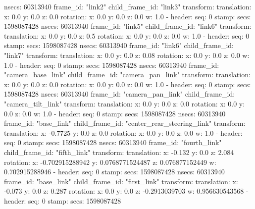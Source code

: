         nsecs:  60313940
      frame_id: "link2"
    child_frame_id: "link3"
    transform: 
      translation: 
        x: 0.0
        y: 0.0
        z: 0.0
      rotation: 
        x: 0.0
        y: 0.0
        z: 0.0
        w: 1.0
  - 
    header: 
      seq: 0
      stamp: 
        secs: 1598087428
        nsecs:  60313940
      frame_id: "link5"
    child_frame_id: "link6"
    transform: 
      translation: 
        x: 0.0
        y: 0.0
        z: 0.5
      rotation: 
        x: 0.0
        y: 0.0
        z: 0.0
        w: 1.0
  - 
    header: 
      seq: 0
      stamp: 
        secs: 1598087428
        nsecs:  60313940
      frame_id: "link6"
    child_frame_id: "link7"
    transform: 
      translation: 
        x: 0.0
        y: 0.0
        z: 0.08
      rotation: 
        x: 0.0
        y: 0.0
        z: 0.0
        w: 1.0
  - 
    header: 
      seq: 0
      stamp: 
        secs: 1598087428
        nsecs:  60313940
      frame_id: "camera_base_link"
    child_frame_id: "camera_pan_link"
    transform: 
      translation: 
        x: 0.0
        y: 0.0
        z: 0.0
      rotation: 
        x: 0.0
        y: 0.0
        z: 0.0
        w: 1.0
  - 
    header: 
      seq: 0
      stamp: 
        secs: 1598087428
        nsecs:  60313940
      frame_id: "camera_pan_link"
    child_frame_id: "camera_tilt_link"
    transform: 
      translation: 
        x: 0.0
        y: 0.0
        z: 0.0
      rotation: 
        x: 0.0
        y: 0.0
        z: 0.0
        w: 1.0
  - 
    header: 
      seq: 0
      stamp: 
        secs: 1598087428
        nsecs:  60313940
      frame_id: "base_link"
    child_frame_id: "center_rear_steering_link"
    transform: 
      translation: 
        x: -0.7725
        y: 0.0
        z: 0.0
      rotation: 
        x: 0.0
        y: 0.0
        z: 0.0
        w: 1.0
  - 
    header: 
      seq: 0
      stamp: 
        secs: 1598087428
        nsecs:  60313940
      frame_id: "fourth_link"
    child_frame_id: "fifth_link"
    transform: 
      translation: 
        x: -0.132
        y: 0.0
        z: 2.084
      rotation: 
        x: -0.702915288942
        y: 0.0768771524487
        z: 0.076877152449
        w: 0.702915288946
  - 
    header: 
      seq: 0
      stamp: 
        secs: 1598087428
        nsecs:  60313940
      frame_id: "base_link"
    child_frame_id: "first_link"
    transform: 
      translation: 
        x: -0.073
        y: 0.0
        z: 0.287
      rotation: 
        x: 0.0
        y: 0.0
        z: -0.2913039703
        w: 0.956630543568
  - 
    header: 
      seq: 0
      stamp: 
        secs: 1598087428
